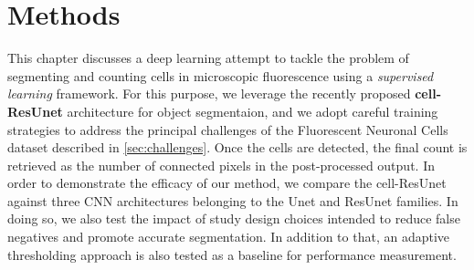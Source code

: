\chapter{Methods}
\label{chap:partI_methods}

This chapter discusses a deep learning attempt to tackle the problem of segmenting and counting cells in microscopic fluorescence using a \textit{supervised learning} framework. 
For this purpose, we leverage the recently proposed \textbf{cell-ResUnet} architecture \cite{morelli2021cresunet} for object segmentaion, and we adopt careful training strategies to address the principal challenges of the Fluorescent Neuronal  Cells dataset \cite{clissa2021fluocells} described in \cref{sec:challenges}.
Once the cells are detected, the final count is retrieved as the number of connected pixels in the post-processed output.
In order to demonstrate the efficacy of our method, we compare the cell-ResUnet against three CNN architectures belonging to the Unet and ResUnet families. 
In doing so, we also test the impact of study design choices intended to reduce false negatives and promote accurate segmentation.
In addition to that, an adaptive thresholding approach is also tested as a baseline for performance measurement. 





